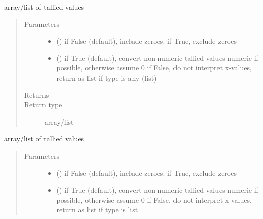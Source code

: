 \documentclass[letterpaper,10pt,english]{sphinxmanual}
\begin{document}
\begin{fulllineitems}
\begin{fulllineitems}
\label{\detokenize{Reference:salabim.Monitor.x}}
array/list of tallied values
\begin{quote}\begin{description}
\item[{Parameters}] \leavevmode\begin{itemize}
\item {} 
 () \textendash{} if False (default), include zeroes. if True, exclude zeroes

\item {} 
 () \textendash{} if True (default), convert non numeric tallied values numeric if possible, otherwise assume 0 
if False, do not interpret x-values, return as list if type is any (list)

\end{itemize}

\item[{Returns}] \leavevmode
{}

\item[{Return type}] \leavevmode
array/list

\end{description}\end{quote}

\end{fulllineitems}


\begin{fulllineitems}
\label{\detokenize{Reference:salabim.Monitor.xweight}}
array/list of tallied values
\begin{quote}\begin{description}
\item[{Parameters}] \leavevmode\begin{itemize}
\item {} 
 () \textendash{} if False (default), include zeroes. if True, exclude zeroes

\item {} 
 () \textendash{} if True (default), convert non numeric tallied values numeric if possible, otherwise assume 0 
if False, do not interpret x-values, return as list if type is list


\end{itemize}
\end{description}
\end{quote}
\end{fulllineitems}
\end{fulllineitems}
\end{document}
